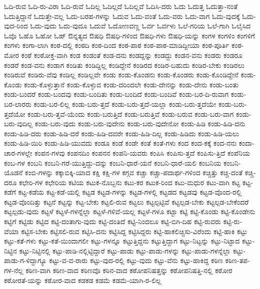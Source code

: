 {ಓದಿ-ರುವ
ಓದಿ-ರು-ವಿರಾ
ಓದಿ-ರುವೆ
ಓದಿಲ್ಲ
ಓದಿಲ್ಲದೆ
ಓದಿಲ್ಲವೆ
ಓದಿಸಿ-ದರು
ಓದು
ಓದುತ್ತ
ಓದುತ್ತಾ-ನಂತೆ
ಓದುತ್ತಿದ್ದಾನೆ
ಓದುತ್ತೇ-ವಲ್ಲ
ಓದು-ಬರಹ-ಗಳನ್ನು
ಓದುವ
ಓದು-ವಂತೆ
ಓದು-ವರು
ಓದು-ವಾಗ
ಓದು-ವುದಕ್ಕೆ
ಓದು-ವುದ-ರಿಂದ
ಓದು-ವುದು
ಓದು-ವುದೂ
ಓದುವೆ
ಓದೋಣವಣ್ಣ
ಓರ್ವ
ಓರ್ವಳು
ಓಲೆ-ಗರಿಯ
ಓಲೆ-ಗಾಗಿ
ಓಲೈಸಿದ
ಓವೊ
ಓಹೊ
ಓಹೋ
ಓಹ್
ಔನ್ನತ್ಯದ
ಔಷಧಿ
ಔಷಧಿ-ಗಳಿಂದ
ಔಷಧಿ-ಗಳು
ಔಷಧಿ-ಯನ್ನು
ಕಂಗಳ
ಕಂಗಳಿಂ
ಕಂಗಳಿಗೆ
ಕಂಗಳು
ಕಂಗಾ-ಲಾಗಿ
ಕಂಠ-ದಲ್ಲಿ
ಕಂಠದಿ
ಕಂಠ-ದಿಂದ
ಕಂಠ-ಪಾಠ
ಕಂಠ-ಪಾಠ-ಮಾಡಿದ್ದೀಯಾ
ಕಂಠ-ಪೂರ್ತಿ
ಕಂಠ-ಮೋರ
ಕಂಠೆ
ಕಂಠೋಕ್ತ-ವಾಗಿ
ಕಂಡ
ಕಂಡಂತೆ
ಕಂಡ-ದನು
ಕಂಡದ್ದನ್ನು
ಕಂಡದ್ದು
ಕಂಡನ-ವನು
ಕಂಡರು
ಕಂಡರೂ
ಕಂಡರೆ
ಕಂಡ-ವನು
ಕಂಡಾಗ
ಕಂಡಿತು
ಕಂಡಿದ್ದಿಲ್ಲ
ಕಂಡಿದ್ದೇನೆ
ಕಂಡಿರದ
ಕಂಡಿರ-ಬಹುದು
ಕಂಡಿರ-ಬೇಕು
ಕಂಡಿರಲು
ಕಂಡಿರುವೆ
ಕಂಡಿರು-ವೆವು
ಕಂಡಿಲ್ಲ
ಕಂಡಿಲ್ಲವೇ
ಕಂಡು
ಕಂಡು-ಕೊಂಡನು
ಕಂಡು-ಕೊಂಡರು
ಕಂಡು-ಕೊಂಡಿದ್ದೇನೆ
ಕಂಡು-ಕೊಂಡು
ಕಂಡು-ಕೊಳ್ಳುತ್ತಾನೆ
ಕಂಡು-ಕೊಳ್ಳುವ
ಕಂಡು-ದರಿಂದಲೇ
ಕಂಡು-ದೇನನ್ನು
ಕಂಡು-ದೇನು
ಕಂಡು-ಬಂತು
ಕಂಡು-ಬಂದರೆ
ಕಂಡು-ಬಂದವು
ಕಂಡು-ಬಂದಿತು
ಕಂಡು-ಬಂದಿದೆ
ಕಂಡು-ಬಂದಿವೆ
ಕಂಡು-ಬರ-ದಿ-ರುವಾಗ
ಕಂಡು-ಬರ-ಲಾರರು
ಕಂಡು-ಬರ-ಲಿಲ್ಲ
ಕಂಡು-ಬರು-ತ್ತದೆ
ಕಂಡು-ಬರು-ತ್ತದೆ-ಯಲ್ಲಾ
ಕಂಡು-ಬರು-ತ್ತದೆಯೇ
ಕಂಡು-ಬರು-ತ್ತದೆಯೋ
ಕಂಡು-ಬರು-ತ್ತವೆ-ಯೆಂದು
ಕಂಡು-ಬರುತ್ತಿದೆ
ಕಂಡು-ಬರುತ್ತಿವೆ
ಕಂಡು-ಬರುವ
ಕಂಡು-ಬರು-ವಾಗ
ಕಂಡು-ಬರು-ವುದಿಲ್ಲ
ಕಂಡು-ಬರು-ವುದು
ಕಂಡು-ಬರು-ವುದೇನು
ಕಂಡು-ಬರು-ವುದೇನೋ
ಕಂಡು-ಹಿಡಿ
ಕಂಡು-ಹಿಡಿ-ದನು
ಕಂಡು-ಹಿಡಿ-ದರು
ಕಂಡು-ಹಿಡಿ-ದರೆ
ಕಂಡು-ಹಿಡಿ-ದವರೇ
ಕಂಡು-ಹಿಡಿ-ದಿಲ್ಲ
ಕಂಡು-ಹಿಡಿದು
ಕಂಡು-ಹಿಡಿ-ಯಲು
ಕಂಡು-ಹಿಡಿ-ಯಿರಿ
ಕಂಡು-ಹಿಡಿ-ಯುವದು
ಕಂಡೂ
ಕಂಡೆ
ಕಂಡೇ
ಕಂತೆ
ಕಂತೆ-ಗಳು
ಕಂದ
ಕಂದ-ಕಕ್ಕೆ
ಕಂದ-ನನು
ಕಂದಾ-ಚಾರ-ಗಳಲ್ಲೇ
ಕಂಪನ-ಗಳವು
ಕಂಪನದಿಂ
ಕಂಪನನ
ಕಂಪನಿ-ಯವರು
ಕಂಪಿಸಿ
ಕಂಪಿಸು-ತ್ತದೆ
ಕಂಪಿಸು-ತ್ತಿದೆ
ಕಂಪೆನಿಯ
ಕಂಬ-ಗಳ
ಕಂಬನಿ
ಕಂಬನಿ-ಗರೆ-ಯುತ್ತಿದ್ದು-ದನ್ನು
ಕಂಬನಿ-ಧಾರೆ-ಯನೆ
ಕಂಬನಿ-ಧಾರೆ-ಯಲಿ
ಕಂಬನಿಯ
ಕಂಬನಿ-ಯೊಡನೆ
ಕಂಬಿ-ಗಳನ್ನು
ಕಕ್ಕಾಬಿಕ್ಕಿ-ಯಾದ
ಕಕ್ಷಿ
ಕಕ್ಷಿ-ಗಳ
ಕಗ್ಗವ
ಕಚ್ಚಾ
ಕಚ್ಚಾ-ಪದಾರ್ಥ-ಗಳಿಂದ
ಕಚ್ಚಿತ್ತು
ಕಚ್ಚಿ-ದಂತೆ
ಕಚ್ಚಿ-ದರೂ
ಕಛೇರಿ-ಗಳ
ಕಛೇರಿಯ
ಕಟಿಯ
ಕಟುಕ-ನೊಬ್ಬನು
ಕಟು-ಕರ
ಕಟುಕ-ರಿಂದ
ಕಟು-ಮಧುರ
ಕಟು-ವಾಗಿ
ಕಟ್ಟ
ಕಟ್ಟ-ಕಡೆಗೆ
ಕಟ್ಟ-ಕಡೆಯ
ಕಟ್ಟ-ಕಡೆ-ಯಲ್ಲಿ
ಕಟ್ಟಡ
ಕಟ್ಟಡ-ಗಳನ್ನು
ಕಟ್ಟಡ-ಗಳಲ್ಲಿ
ಕಟ್ಟಡದ
ಕಟ್ಟಡವು
ಕಟ್ಟಡ-ವೊಂದ-ರಲ್ಲಿ
ಕಟ್ಟಡ-ವೊಂದಿತ್ತು
ಕಟ್ಟನೆ
ಕಟ್ಟನ್ನು
ಕಟ್ಟ-ಬೇಕು
ಕಟ್ಟಲಿ-ರುವ
ಕಟ್ಟಲು
ಕಟ್ಟಲ್ಪಟ್ಟಿವೆ
ಕಟ್ಟಲ್ಪಡ-ಬೇಕು
ಕಟ್ಟಲ್ಪಡ-ಬೇಕೆಂದರೆ
ಕಟ್ಟಲ್ಪಡು-ವುದು
ಕಟ್ಟಳೆ
ಕಟ್ಟಳೆ-ಗಳನ್ನೆಲ್ಲಾ
ಕಟ್ಟಳೆ-ಗಳಿವೆ-ಯಲ್ಲ
ಕಟ್ಟಳೆ-ಗಳೂ
ಕಟ್ಟಾ
ಕಟ್ಟಿ
ಕಟ್ಟಿ-ಕೊಂಡು
ಕಟ್ಟಿ-ಕೊಂಡೇನು
ಕಟ್ಟಿಗೆ
ಕಟ್ಟಿಡು
ಕಟ್ಟಿದ
ಕಟ್ಟಿ-ದಂತಾಗು-ವುದು
ಕಟ್ಟಿ-ದಂತಿದೆ
ಕಟ್ಟಿ-ನಿಂದಲೂ
ಕಟ್ಟಿ-ಬಿಗಿ-ದಿಹ
ಕಟ್ಟಿ-ರುವರು
ಕಟ್ಟಿ-ರು-ವೆಯಾ
ಕಟ್ಟಿಸ-ಬೇಕು
ಕಟ್ಟಿಸಲಿ-ರುವ
ಕಟ್ಟಿಸಿ-ದನು
ಕಟ್ಟಿಸಿದ್ದ
ಕಟ್ಟಿಸಿದ್ದರು
ಕಟ್ಟಿ-ಹಾಕಲಿಚ್ಚಿಸು-ವಿರೆಂದು
ಕಟ್ಟಿ-ಹಾಕಿ
ಕಟ್ಟು
ಕಟ್ಟು-ಕತೆ-ಗಳು
ಕಟ್ಟು-ಕತೆ-ಯಿಂದಾಗಲೀ
ಕಟ್ಟು-ಗಳನ್ನೂ
ಕಟ್ಟುತ್ತಿದ್ದನು
ಕಟ್ಟುತ್ತಿದ್ದಾಗ
ಕಟ್ಟು-ನಿಟ್ಟನ್ನು
ಕಟ್ಟು-ನಿಟ್ಟಾದ
ಕಟ್ಟು-ನಿಟ್ಟಿನ
ಕಟ್ಟು-ನಿಟ್ಟಿನಲ್ಲಿ
ಕಟ್ಟು-ಪಾಡಿ-ನಲ್ಲಿಟ್ಟಿದ್ದಾರೆ
ಕಟ್ಟು-ಪಾಡು
ಕಟ್ಟು-ಪಾಡು-ಗಳನ್ನು
ಕಟ್ಟು-ಪಾಡು-ಗಳನ್ನೆಲ್ಲಾ
ಕಟ್ಟು-ಪಾಡು-ಗ-ಳಿದ್ದಾಗ್ಯೂ
ಕಟ್ಟು-ವ-ವ-ರಾರು
ಕಟ್ಟು-ವುದ-ರಲ್ಲಿ
ಕಟ್ಟು-ವುದು
ಕಟ್ಟು-ವೆನು
ಕಟ್ಟು-ಹಾಕಿದ್ದ
ಕಠಿಣ
ಕಠಿಣ-ತಪ-ಗಳ-ನೆಲ್ಲ
ಕಠಿಣ-ವಾಗಿ
ಕಠಿಣ-ವಾದ
ಕಠಿಣವೊ
ಕಠಿನ-ವಾದ
ಕಠೋಪನಿಷತ್ತನ್ನು
ಕಠೋಪನಿಷತ್ತಿ-ನಲ್ಲಿ
ಕಠೋರ
ಕಠೋರತೆ-ಯನ್ನು
ಕಠೋರ-ವಾದ
ಕಡಕಡ
ಕಡಮೆ
ಕಡಮೆ-ಯಾಗಿ-ರ-ಲಿಲ್ಲ
}
